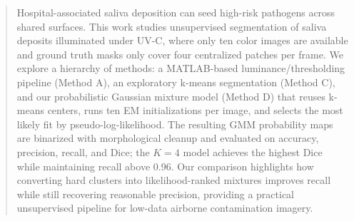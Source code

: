 \begin{abstract}
Hospital-associated saliva deposition can seed high-risk pathogens across shared surfaces. This work studies unsupervised segmentation of saliva deposits illuminated under UV-C, where only ten color images are available and ground truth masks only cover four centralized patches per frame. We explore a hierarchy of methods: a MATLAB-based luminance/thresholding pipeline (Method A), an exploratory k-means segmentation (Method C), and our probabilistic Gaussian mixture model (Method D) that reuses k-means centers, runs ten EM initializations per image, and selects the most likely fit by pseudo-log-likelihood. The resulting GMM probability maps are binarized with morphological cleanup and evaluated on accuracy, precision, recall, and Dice; the \(K{=}4\) model achieves the highest Dice while maintaining recall above 0.96. Our comparison highlights how converting hard clusters into likelihood-ranked mixtures improves recall while still recovering reasonable precision, providing a practical unsupervised pipeline for low-data airborne contamination imagery.
\end{abstract}